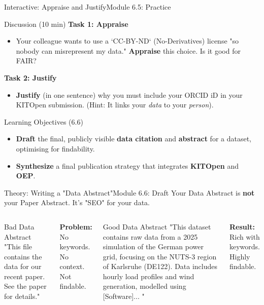 \begin{frame}{Interactive: Appraise and Justify}{Module 6.5: Practice}
    \begin{block}{Discussion (10 min)}
        \textbf{Task 1: Appraise}
        \begin{itemize}
            \item Your colleague wants to use a `CC-BY-ND` (No-Derivatives) license "so nobody can misrepresent my data." \textbf{Appraise} this choice. Is it good for FAIR?
        \end{itemize}
        \pause
        \textbf{Task 2: Justify}
        \begin{itemize}
            \item \textbf{Justify} (in one sentence) why you must include your ORCID iD in your KITOpen submission. (Hint: It links your \textit{data} to your \textit{person}).
        \end{itemize}
    \end{block}
\end{frame}

\begin{frame}{Learning Objectives (6.6)}
    \begin{itemize}
        \item \textbf{Draft} the final, publicly visible \textbf{data citation} and \textbf{abstract} for a dataset, optimising for findability.
        \item \textbf{Synthesize} a final publication strategy that integrates \textbf{KITOpen} and \textbf{OEP}.
    \end{itemize}
\end{frame}

\begin{frame}{Theory: Writing a "Data Abstract"}{Module 6.6: Draft}
    Your Data Abstract is \textbf{not} your Paper Abstract. It's "SEO" for your data.
    
    \begin{columns}
        \begin{block}{Bad Data Abstract}
            "This file contains the data for our recent paper. See the paper for details."
        \end{block}
        \vspace{3.2ex}
        \pause
        \textbf{Problem:} No keywords. No context. Not findable.
        
        \begin{block}{Good Data Abstract}
            "This dataset contains raw data from a 2025 simulation of the German power grid, focusing on the NUTS-3 region of Karlsruhe (DE122). Data includes hourly load profiles and wind generation, modelled using [Software]... "
        \end{block}
        \pause
            \textbf{Result:} Rich with keywords. Highly findable.
    \end{columns}
\end{frame}


